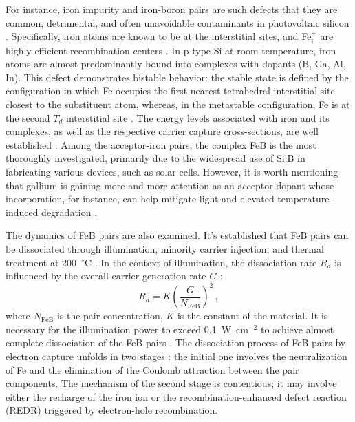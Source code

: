\documentclass{WileyMSP-template}
\begin{document}
For instance, iron impurity and iron-boron pairs are such defects that they are common, detrimental, and often unavoidable contaminants in photovoltaic silicon \cite{Frascaroli2021,Sun2021}.
Specifically, iron atoms are known to be at the interstitial sites, and Fe$_i^+$ are highly efficient recombination centers \cite{WeberFe}.
In p-type Si at room temperature, iron atoms are almost predominantly bound into complexes with dopants (B, Ga, Al, In).
This defect demonstrates bistable behavior: the stable state is defined by the configuration in which Fe occupies
the first nearest tetrahedral interstitial site closest to the substituent atom,
whereas, in the metastable configuration, Fe is at the second $T_d$ interstitial site \cite{FeB:PhysRevB49}.
The energy levels associated with iron and its complexes, as well as the respective carrier capture cross-sections, are well established \cite{Juhl2018,ROUGIEUX2018}.
Among the acceptor-iron pairs, the complex FeB is the most thoroughly investigated,
primarily due to the widespread use of Si:B in fabricating various devices, such as solar cells.
However, it is worth mentioning that gallium is gaining more and more attention as an acceptor dopant whose incorporation,
for instance, can help mitigate light and elevated temperature-induced degradation \cite{Ning2022}.

The dynamics of FeB pairs are also examined.
It's established that FeB pairs can be dissociated through illumination, minority carrier injection, and thermal treatment at 200~$^\circ$C \cite{FeBAssJAP2014}.
In the context of illumination, the dissociation rate $R_d$ is influenced by the overall carrier generation rate $G$ \cite{FeBLight2,FeBAssJAP2014,FeBKin2019,FeMethod2012}:
\begin{equation}
\label{eqRd}
R_d=K\left(\frac{G}{N_\mathrm{FeB}}\right)^2\,,
\end{equation}
where
$N_\mathrm{FeB}$ is the pair concentration,
$K$ is the constant of the material.
It is necessary for the illumination power to exceed 0.1~W~cm$^{-2}$ to achieve almost complete dissociation of the FeB pairs \cite{Macdonald2004}.
The dissociation process of FeB pairs by electron capture unfolds in two stages \cite{KIMERLINGFeB,FeBAssJAP2014}:
the initial one involves the neutralization of Fe and the elimination of the Coulomb attraction between the pair components.
The mechanism of the second stage is contentious; it may involve either the recharge of the iron ion or the recombination-enhanced defect reaction
(REDR) triggered by electron-hole recombination.
\end{document}
